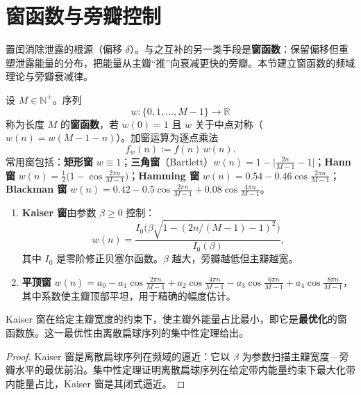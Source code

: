 \section{窗函数与旁瓣控制}\label{sec:window_functions}

置闰消除泄露的根源（偏移 $\delta$）。与之互补的另一类手段是\textbf{窗函数}：保留偏移但重塑泄露能量的分布，把能量从主瓣“推”向衰减更快的旁瓣。本节建立窗函数的频域理论与旁瓣衰减律。

\begin{definition}[窗函数与加窗]\label{def:window_function}
设 $M\in\mathbb{N}^+$。序列
\[
w:\{0,1,\dots,M-1\}\to\mathbb{R}
\]
称为长度 $M$ 的\textbf{窗函数}，若 $w(0)=1$ 且 $w$ 关于中点对称（$w(n)=w(M-1-n)$）。加窗运算为逐点乘法
\[
f_w(n):=f(n)\,w(n).
\]
常用窗包括：\textbf{矩形窗} $w\equiv1$；\textbf{三角窗}（Bartlett）$w(n)=1-\big|\frac{2n}{M-1}-1\big|$；\textbf{Hann 窗} $w(n)=\frac12\big(1-\cos\frac{2\pi n}{M-1}\big)$；\textbf{Hamming 窗} $w(n)=0.54-0.46\cos\frac{2\pi n}{M-1}$；\textbf{Blackman 窗} $w(n)=0.42-0.5\cos\frac{2\pi n}{M-1}+0.08\cos\frac{4\pi n}{M-1}$。
\end{definition}

\begin{definition}\label{def:kaiser_flat_top_window}
\begin{enumerate}[label=(\roman*)]
    \item \textbf{Kaiser 窗}由参数 $\beta\ge0$ 控制：
    \[
    w(n)=\frac{I_0\big(\beta\sqrt{1-(2n/(M-1)-1)^2}\big)}{I_0(\beta)},
    \]
    其中 $I_0$ 是零阶修正贝塞尔函数。$\beta$ 越大，旁瓣越低但主瓣越宽。
    \item \textbf{平顶窗} $w(n)=a_0-a_1\cos\frac{2\pi n}{M-1}+a_2\cos\frac{4\pi n}{M-1}-a_3\cos\frac{6\pi n}{M-1}+a_4\cos\frac{8\pi n}{M-1}$，其中系数使主瓣顶部平坦，用于精确的幅度估计。
\end{enumerate}
\end{definition}

\begin{property}\label{prop:kaiser_optimality}
Kaiser 窗在给定主瓣宽度的约束下，使主瓣外能量占比最小，即它是\textbf{最优化}的窗函数族。这一最优性由离散扁球序列的集中性定理给出。
\end{property}

\begin{proof}
Kaiser 窗是离散扁球序列在频域的逼近：它以 $\beta$ 为参数扫描主瓣宽度—旁瓣水平的最优前沿。集中性定理证明离散扁球序列在给定带内能量约束下最大化带内能量占比，Kaiser 窗是其闭式逼近。
\end{proof}

